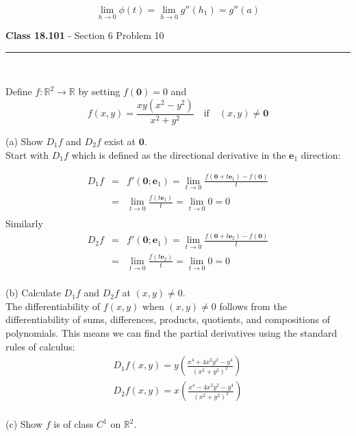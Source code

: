 \documentclass[11pt,reqno]{article}
\begin{document}
\[ \lim_{h \to 0} \phi(t) = \lim_{h \to 0} g''(h_1) = g''(a) \]

\begin{flushleft} 
\textbf{Class 18.101} - Section 6 Problem 10\\
\rule{500pt}{1pt}\\
\end{flushleft} 

\noindent Define $f : \mathbb{R}^2 \to \mathbb{R}$ by setting $f(\textbf{0}) = 0$ and 
\[ f(x,y) = \frac{xy(x^2 - y^2)}{x^2 + y^2} \quad \text{if} \quad \text{$(x,y) \neq \textbf{0}$} \]

\noindent (a) Show $D_1 f$ and $D_2 f$ exist at $\textbf{0}$.\\

\noindent Start with $D_1 f$ which is defined as the directional derivative in the $\textbf{e}_1$ direction:

\begin{eqnarray*}
D_1 f &=& f'(\textbf{0};\textbf{e}_1) = \lim_{t \to 0} \frac{f(\textbf{0} + t \textbf{e}_1) - f(\textbf{0})}{t}\\
&=& \lim_{t \to 0} \frac{f(t \textbf{e}_1)}{t} = \lim_{t \to 0} 0 = 0\\
\end{eqnarray*}
Similarly
\begin{eqnarray*}
D_2 f &=& f'(\textbf{0};\textbf{e}_1) = \lim_{t \to 0} \frac{f(\textbf{0} + t \textbf{e}_2) - f(\textbf{0})}{t}\\
&=& \lim_{t \to 0} \frac{f(t \textbf{e}_2)}{t} = \lim_{t \to 0} 0 = 0\\
\end{eqnarray*}

\noindent (b) Calculate $D_1 f$ and $D_2 f$ at $(x,y) \neq 0$. \\

The differentiability of $f(x,y)$ when $(x,y) \neq 0$ follows from the differentiability of sums, differences, products, quotients, and compositions of polynomials. This means we can find the partial derivatives using the standard rules of calculus:
\begin{eqnarray*}
D_1 f (x,y) = y \left( \frac{x^4 + 4 x^2 y^2 - y^4}{(x^2 + y^2)^2} \right)\\
D_2 f (x,y) = x \left( \frac{x^4 - 4 x^2 y^2 - y^4}{(x^2 + y^2)^2} \right)\\
\end{eqnarray*}

\noindent (c) Show $f$ is of class $C^1$ on $\mathbb{R}^2$.\\
\end{document}
